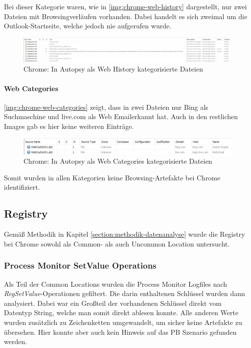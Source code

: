 \begin{appendices}
Bei dieser Kategorie waren, wie in \autoref{img:chrome-web-history} dargestellt, nur zwei Dateien mit Browsingverläufen vorhanden. Dabei handelt es sich zweimal um die Outlook-Startseite, welche jedoch nie aufgerufen wurde.

\begin{figure}[ht]
	\centering
	\includegraphics[width=\textwidth]{bilder/CHHis.png}
	\caption{Chrome: In Autopsy als \glqq{}Web History\grqq{} kategorisierte Dateien}
	\label{img:chrome-web-history}  
\end{figure}

\paragraph*{Web Categories}\label{chap:anhang-chrome-uncommon-autopsy-web-categories}
\autoref{img:chrome-web-categories} zeigt, dass in zwei	 Dateien nur Bing als Suchmaschine und live.com als \glqq{}Web Email\grqq erkannt hat. Auch in den restlichen Images gab es hier keine weiteren Einträge.


\begin{figure}[h!]
	\centering
	\includegraphics[width=\textwidth]{bilder/CHCat2.png}
	\caption{Chrome: In Autopsy als \glqq{}Web Categories\grqq{} kategorisierte Dateien}
	\label{img:chrome-web-categories}  
\end{figure}

Somit wurden in allen Kategorien keine Browsing-Artefakte bei Chrome identifiziert.

\subsection{Registry}\label{chap:anhang-chrome-registry}
Gemäß Methodik in Kapitel \ref{section:methodik-datenanalyse} wurde die Registry bei Chrome sowohl als Common- als auch Uncommon Location untersucht.

\subsubsection*{Process Monitor SetValue Operations}\label{chap:anhang-chrome-common-registry}
Als Teil der Common Locations wurden die Process Monitor Logfiles nach \textit{RegSetValue}-Operationen gefiltert. Die darin enthaltenen Schlüssel wurden dann analysiert. Dabei war ein Großteil der vorhandenen Schlüssel direkt vom Datentyp String, welche man somit direkt ablesen konnte. Alle anderen Werte wurden zusätzlich zu Zeichenketten umgewandelt, um sicher keine Artefakte zu übersehen. Hier konnte aber auch kein Hinweis auf das PB Szenario gefunden werden. 


\end{appendices}
